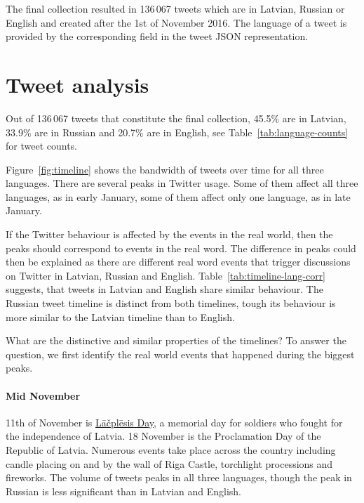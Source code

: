 \documentclass[11pt,a4paper]{article}
\begin{document}
The final collection resulted in 136\,067 tweets which are in Latvian, Russian or English and created after the 1st of November 2016. The language of a tweet is provided by the corresponding field in the tweet JSON representation.

\section{Tweet analysis}
\label{sec:timeline}



Out of 136\,067 tweets that constitute the final collection, 45.5\% are in Latvian, 33.9\% are in Russian and 20.7\% are in English, see Table~\ref{tab:language-counts} for tweet counts.



Figure~\ref{fig:timeline} shows the bandwidth of tweets over time for all three languages. There are several peaks in Twitter usage. Some of them affect all three languages, as in early January, some of them affect only one language, as in late January. %

If the Twitter behaviour is affected by the events in the real world, then the peaks should correspond to events in the real word. The difference in peaks could then be explained as there are different real word events that trigger discussions on Twitter in Latvian, Russian and English. Table~\ref{tab:timeline-lang-corr} suggests, that tweets in Latvian and English share similar behaviour. The Russian tweet timeline is distinct from both timelines, tough its behaviour is more similar to the Latvian timeline than to English.



What are the distinctive and similar properties of the timelines? To answer the question, we first identify the real world events that happened during the biggest peaks.

\paragraph{Mid November}

11th of November is \href{https://en.wikipedia.org/wiki/L\%C4\%81\%C4\%8Dpl\%C4\%93sis_Day}{L\={a}\v{c}pl\={e}sis Day}, a memorial day for soldiers who fought for the independence of Latvia. 18 November is the Proclamation Day of the Republic of Latvia. Numerous events take place across the country including candle placing on and by the wall of Riga Castle, torchlight processions and fireworks. The volume of tweets peaks in all three languages, though the peak in Russian is less significant than in Latvian and English.
\end{document}

